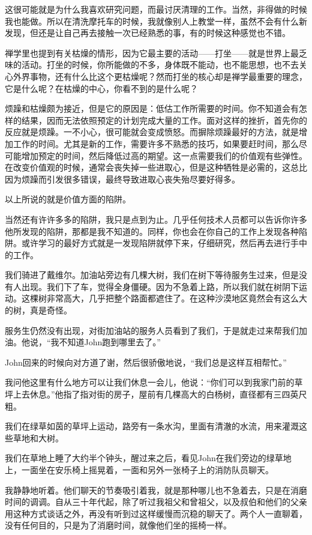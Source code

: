 \documentclass[UTF8]{article}
\begin{document}
\par 这很可能就是为什么我喜欢研究问题，而最讨厌清理的工作。当然，非得做的时候我也能做。所以在清洗摩托车的时候，我就像别人上教堂一样，虽然不会有什么新发现，但还是让自己再去接触一次已经熟悉的事，有的时候这种感觉也不错。
\par 禅学里也提到有关枯燥的情形，因为它最主要的活动——打坐——就是世界上最乏味的活动。打坐的时候，你所能做的不多，身体既不能动，也不能思想，也不去关心外界事物，还有什么比这个更枯燥呢？然而打坐的核心却是禅学最重要的理念，它是什么呢？在枯燥的中心，你看不到的是什么呢？
\par 烦躁和枯燥颇为接近，但是它的原因是：低估工作所需要的时间。你不知道会有怎样的结果，因而无法依照预定的计划完成大量的工作。面对这样的挫折，首先你的反应就是烦躁。一不小心，很可能就会变成愤怒。而摒除烦躁最好的方法，就是增加工作的时间。尤其是新的工作，需要许多不熟悉的技巧，如果要赶时间，那么尽可能增加预定的时间，然后降低过高的期望。这一点需要我们的价值观有些弹性。在改变价值观的时候，通常会丧失掉一些进取心，但是这种牺牲是必需的，这总比因为烦躁而引发很多错误，最终导致进取心丧失殆尽要好得多。
\par 以上所说的就是价值方面的陷阱。
\par 当然还有许许多多的陷阱，我只是点到为止。几乎任何技术人员都可以告诉你许多他所发现的陷阱，那都是我不知道的。同样，你也会在你自己的工作上发现各种陷阱。或许学习的最好方式就是一发现陷阱就停下来，仔细研究，然后再去进行手中的工作。
\par 我们骑进了戴维尔。加油站旁边有几棵大树，我们在树下等待服务生过来，但是没有人出现。我们下了车，觉得全身僵硬。因为不急着上路，所以我们就在树阴下运动。这棵树非常高大，几乎把整个路面都遮住了。在这种沙漠地区竟然会有这么大的树，真是奇怪。
\par 服务生仍然没有出现，对街加油站的服务人员看到了我们，于是就走过来帮我们加油。他说，“我不知道John跑到哪里去了。”
\par John回来的时候向对方道了谢，然后很骄傲地说，“我们总是这样互相帮忙。”
\par 我问他这里有什么地方可以让我们休息一会儿，他说：“你们可以到我家门前的草坪上去休息。”他指了指对街的房子，屋前有几棵高大的白杨树，直径都有三四英尺粗。
\par 我们在绿草如茵的草坪上运动，路旁有一条水沟，里面有清澈的水流，用来灌溉这些草地和大树。
\par 我们在草地上睡了大约半个钟头，醒过来之后，看见John在我们旁边的绿草地上，一面坐在安乐椅上摇晃着，一面和另外一张椅子上的消防队员聊天。
\par 我静静地听着。他们聊天的节奏吸引着我，就是那种哪儿也不急着去，只是在消磨时间的调调。自从三十年代起，除了听过我祖父和曾祖父，以及叔伯和他们的父亲用这种方式谈话之外，再没有听到过这样缓慢而沉稳的聊天了。两个人一直聊着，没有任何目的，只是为了消磨时间，就像他们坐的摇椅一样。
\end{document}
